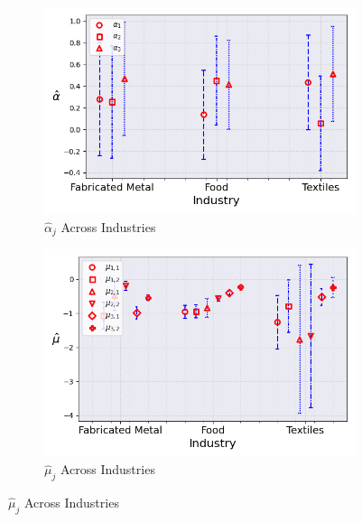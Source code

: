 \documentclass{article}
\begin{document}
\begin{figure}[ht!]
    \centering 
    \caption{I.I.D Mixture Model Across Industries ($\hat{M}_0 = 3$)}
    \begin{subfigure}[t]{0.32\textwidth}
        \centering
        \includegraphics[width=\textwidth]{figure/stationary_mixture_alpha_across_industries_m3.png}
        \caption{$\hat\alpha_j$ Across Industries}
    \end{subfigure}
    \begin{subfigure}[t]{0.32\textwidth}
        \centering
        \includegraphics[width=\textwidth]{figure/stationary_mixture_mu_across_industries_m3.png}
        \caption{$\hat\mu_j$ Across Industries}
    \end{subfigure}


\end{figure}
\end{document}
